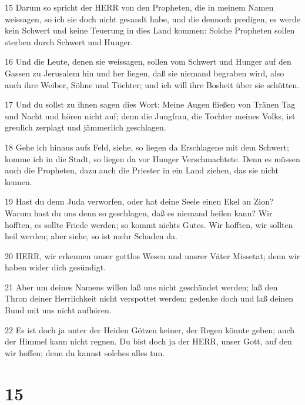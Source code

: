 \par 15 Darum so spricht der HERR von den Propheten, die in meinem Namen weissagen, so ich sie doch nicht gesandt habe, und die dennoch predigen, es werde kein Schwert und keine Teuerung in dies Land kommen: Solche Propheten sollen sterben durch Schwert und Hunger.
\par 16 Und die Leute, denen sie weissagen, sollen vom Schwert und Hunger auf den Gassen zu Jerusalem hin und her liegen, daß sie niemand begraben wird, also auch ihre Weiber, Söhne und Töchter; und ich will ihre Bosheit über sie schütten.
\par 17 Und du sollst zu ihnen sagen dies Wort: Meine Augen fließen von Tränen Tag und Nacht und hören nicht auf; denn die Jungfrau, die Tochter meines Volks, ist greulich zerplagt und jämmerlich geschlagen.
\par 18 Gehe ich hinaus aufs Feld, siehe, so liegen da Erschlagene mit dem Schwert; komme ich in die Stadt, so liegen da vor Hunger Verschmachtete. Denn es müssen auch die Propheten, dazu auch die Priester in ein Land ziehen, das sie nicht kennen.
\par 19 Hast du denn Juda verworfen, oder hat deine Seele einen Ekel an Zion? Warum hast du uns denn so geschlagen, daß es niemand heilen kann? Wir hofften, es sollte Friede werden; so kommt nichts Gutes. Wir hofften, wir sollten heil werden; aber siehe, so ist mehr Schaden da.
\par 20 HERR, wir erkennen unser gottlos Wesen und unsrer Väter Missetat; denn wir haben wider dich gesündigt.
\par 21 Aber um deines Namens willen laß uns nicht geschändet werden; laß den Thron deiner Herrlichkeit nicht verspottet werden; gedenke doch und laß deinen Bund mit uns nicht aufhören.
\par 22 Es ist doch ja unter der Heiden Götzen keiner, der Regen könnte geben; auch der Himmel kann nicht regnen. Du bist doch ja der HERR, unser Gott, auf den wir hoffen; denn du kannst solches alles tun.

\chapter{15}

